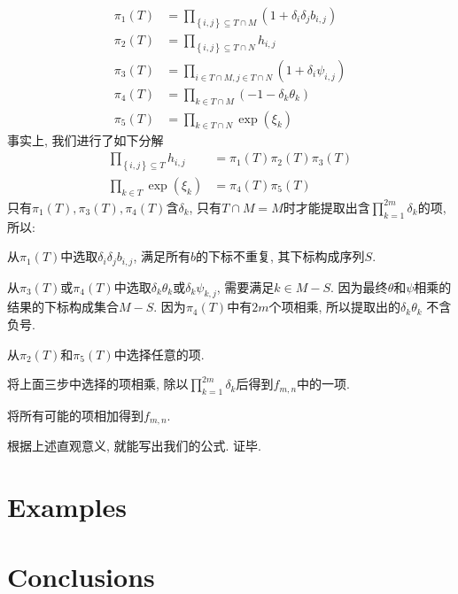 \documentclass[12pt,a4paper,UTF8]{article}
\newcommand{\sbrace}[1]{\left(#1\right)}
\newcommand{\bbrace}[1]{\left\{#1\right\}}
\begin{document}
\begin{equation}
\begin{aligned}
  \pi_1(T)&=\prod_{\bbrace{i,j}\subseteq T\cap M}\sbrace{1+\delta_i \delta_j b_{i,j}} \\
  \pi_2(T)&=\prod_{\bbrace{i,j}\subseteq T\cap N}{h_{i,j}} \\
  \pi_3(T)&=\prod_{i\in T\cap M,j\in T\cap N}\sbrace{1+\delta_i \psi_{i,j}} \\
  \pi_4(T)&=\prod_{k\in T\cap M}\sbrace{-1-\delta_k \theta_k} \\
  \pi_5(T)&=\prod_{k\in T\cap N}{\exp(\xi_k)}
\end{aligned}
\end{equation}
事实上, 我们进行了如下分解 
\begin{equation}
\begin{aligned}
  \prod_{\bbrace{i,j}\subseteq T}{h_{i,j}}&=\pi_1(T)\pi_2(T)\pi_3(T) \\ 
  \prod_{k\in T}{\exp(\xi_k)}&=\pi_4(T)\pi_5(T)
\end{aligned}
\end{equation}
只有$\pi_1(T),\pi_3(T),\pi_4(T)$含$\delta_k$, 只有$T\cap M=M$时才能提取出含$\prod_{k=1}^{2m}{\delta_k}$的项, 所以:
\begin{compactenum}[Step 1.]
\item 从$\pi_1(T)$中选取$\delta_i \delta_j b_{i,j}$, 满足所有$b$的下标不重复, 其下标构成序列$S$.
\item 从$\pi_3(T)$或$\pi_4(T)$中选取$\delta_k \theta_k$或$\delta_k \psi_{k,j}$, 需要满足$k\in M-S$. 因为最终$\theta$和$\psi$相乘的结果的下标构成集合$M-S$. 因为$\pi_4(T)$中有$2m$个项相乘, 所以提取出的$\delta_k \theta_k$ 不含负号. 
\item 从$\pi_2(T)$和$\pi_5(T)$中选择任意的项.
\item 将上面三步中选择的项相乘, 除以$\prod_{k=1}^{2m}{\delta_k}$后得到$f_{m,n}$中的一项.
\item 将所有可能的项相加得到$f_{m,n}$.
\end{compactenum}
根据上述直观意义, 就能写出我们的公式. 证毕. 

\section{Examples}\label{example}

\section{Conclusions}\label{conclusion}
\end{document}

